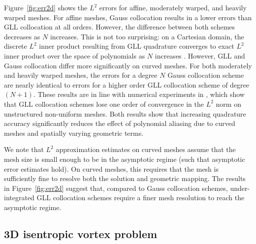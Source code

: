 \documentclass[onefignum,onetabnum,final]{siamart171218}
\begin{document}
Figure~\ref{fig:err2d} shows the $L^2$ errors for affine, moderately warped, and heavily warped meshes.  For affine meshes, Gauss collocation results in a lower errors than GLL collocation at all orders.  However, the difference between both schemes decreases as $N$ increases.  This is not too surprising: on a Cartesian domain, the discrete $L^2$ inner product resulting from GLL quadrature converges to exact $L^2$ inner product over the space of polynomials as $N$ increases \cite{quarteroni1994introduction}.  However, GLL and Gauss collocation differ more significantly on curved meshes.  For both moderately and heavily warped meshes, the errors for a degree $N$ Gauss collocation scheme are nearly identical to errors for a higher order GLL collocation scheme of degree $(N+1)$.  These results are in line with numerical experiments in \cite{parsani2016entropy}, which show that GLL collocation schemes lose one order of convergence in the $L^2$ norm on unstructured non-uniform meshes.  Both results show that increasing quadrature accuracy significantly reduces the effect of polynomial aliasing due to curved meshes and spatially varying geometric terms.  

We note that $L^2$ approximation estimates on curved meshes \cite{lenoir1986optimal, warburton2013low} assume that the mesh size is small enough to be in the asymptotic regime (such that asymptotic error estimates hold).  On curved meshes, this requires that the mesh is sufficiently fine to resolve both the solution and geometric mapping.   The results in Figure~\ref{fig:err2d} suggest that, compared to Gauss collocation schemes, under-integrated GLL collocation schemes require a finer mesh resolution to reach the asymptotic regime.  

\subsection{3D isentropic vortex problem}
\end{document}
